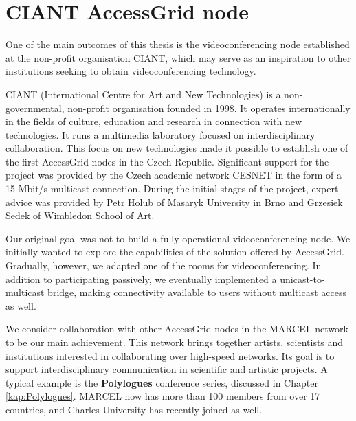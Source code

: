 \chapter{CIANT AccessGrid node}\label{kap:CIANT-AG-NODE}

One of the main outcomes of this thesis is the videoconferencing node established at the non-profit organisation CIANT, which may serve as an inspiration to other institutions seeking to obtain videoconferencing technology.

CIANT (International Centre for Art and New Technologies) is a non-governmental, non-profit organisation founded in 1998. It operates internationally in the fields of culture, education and research in connection with new technologies. It runs a multimedia laboratory focused on interdisciplinary collaboration. This focus on new technologies made it possible to establish one of the first AccessGrid nodes in the Czech Republic. Significant support for the project was provided by the Czech academic network CESNET in the form of a 15 Mbit/s multicast connection. During the initial stages of the project, expert advice was provided by Petr Holub of Masaryk University in Brno and Grzesiek Sedek of Wimbledon School of Art.

Our original goal was not to build a fully operational videoconferencing node. We initially wanted to explore the capabilities of the solution offered by AccessGrid. Gradually, however, we adapted one of the rooms for videoconferencing. In addition to participating passively, we eventually implemented a unicast-to-multicast bridge, making connectivity available to users without multicast access as well.

We consider collaboration with other AccessGrid nodes in the MARCEL network to be our main achievement. This network brings together artists, scientists and institutions interested in collaborating over high-speed networks. Its goal is to support interdisciplinary communication in scientific and artistic projects. A typical example is the \textbf{Polylogues} conference series, discussed in Chapter \ref{kap:Polylogues}. MARCEL now has more than 100 members from over 17 countries, and Charles University has recently joined as well.

